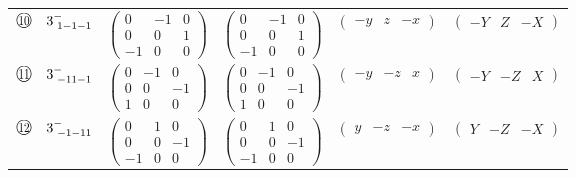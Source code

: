 \documentclass[fleqn,10pt,landscape]{jsarticle}
\begin{document}
\begin{center}
\begin{longtable}{lcccc}
$ {\ooalign{\hfil\resizebox{.8\width}{\height}{10}\hfil\crcr\raise.1ex\hbox{\large$\bigcirc$}}}\quad 3^{-}_{\,\,1-1-1} $ & $ \begin{pmatrix} 0 & -1 & 0 \\ 0 & 0 & 1 \\ -1 & 0 & 0 \end{pmatrix} $ & $ \begin{pmatrix} 0 & -1 & 0 \\ 0 & 0 & 1 \\ -1 & 0 & 0 \end{pmatrix} $ & $ \begin{pmatrix} - y & z & - x \end{pmatrix} $ & $ \begin{pmatrix} - Y & Z & - X \end{pmatrix} $ \\
$ {\ooalign{\hfil\resizebox{.8\width}{\height}{11}\hfil\crcr\raise.1ex\hbox{\large$\bigcirc$}}}\quad 3^{-}_{\,\,-11-1} $ & $ \begin{pmatrix} 0 & -1 & 0 \\ 0 & 0 & -1 \\ 1 & 0 & 0 \end{pmatrix} $ & $ \begin{pmatrix} 0 & -1 & 0 \\ 0 & 0 & -1 \\ 1 & 0 & 0 \end{pmatrix} $ & $ \begin{pmatrix} - y & - z & x \end{pmatrix} $ & $ \begin{pmatrix} - Y & - Z & X \end{pmatrix} $ \\
$ {\ooalign{\hfil\resizebox{.8\width}{\height}{12}\hfil\crcr\raise.1ex\hbox{\large$\bigcirc$}}}\quad 3^{-}_{\,\,-1-11} $ & $ \begin{pmatrix} 0 & 1 & 0 \\ 0 & 0 & -1 \\ -1 & 0 & 0 \end{pmatrix} $ & $ \begin{pmatrix} 0 & 1 & 0 \\ 0 & 0 & -1 \\ -1 & 0 & 0 \end{pmatrix} $ & $ \begin{pmatrix} y & - z & - x \end{pmatrix} $ & $ \begin{pmatrix} Y & - Z & - X \end{pmatrix} $ \\
\end{longtable}
\end{center}
\end{document}
